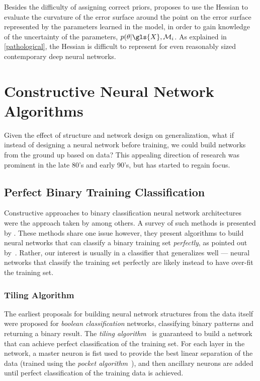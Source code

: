\documentclass[thesis]{subfiles}
\begin{document}
Besides the difficulty of assigning correct priors, \citet{mackay1992practical} proposes to use the Hessian to evaluate the curvature of the error surface around the point on the error surface represented by the parameters learned in the model, in order to gain knowledge of the uncertainty of the parameters, \ie{}$p(\mathbf{\theta}|\gls{X},\mathcal{M}_i$. As explained in \cref{pathological}, the Hessian is difficult to represent for even reasonably sized contemporary deep neural networks.

\section{Constructive Neural Network Algorithms}
	Given the effect of structure and network design on generalization, what if instead of designing a neural network before training, we could build networks from the ground up based on data? This appealing direction of research was prominent in the late 80's and early 90's, but has started to regain focus. 	
	\subsection{Perfect Binary Training Classification}
Constructive approaches to binary classification neural network architectures were the approach taken by \citet{mezard1989learning,Fahlman1989,frean1990upstart} among others. A survey of such methods is presented by \citet{parekh2000constructive}. These methods share one issue however, they  present algorithms to build neural networks that can classify a binary training set \emph{perfectly}, as pointed out by~\citet{Bishop1995}. Rather, our interest is usually in a classifier that generalizes well --- neural networks that classify the training set perfectly are likely instead to have over-fit the training set.
	
	\subsubsection{Tiling Algorithm}\label{tilingalgo}
	The earliest proposals for building neural network structures from the data itself were proposed for \emph{boolean classification} networks, \ie classifying binary patterns and returning a binary result. The \emph{tiling algorithm}~\citep{mezard1989learning} is guaranteed to build a network that can achieve perfect classification of the training set. For each layer in the network, a master neuron is fist used to provide the best linear separation of the data (trained using the \emph{pocket algorithm}~\citep{gallant1986optimal}), and then ancillary neurons are added until perfect classification of the training data is achieved. 
	
\end{document}
